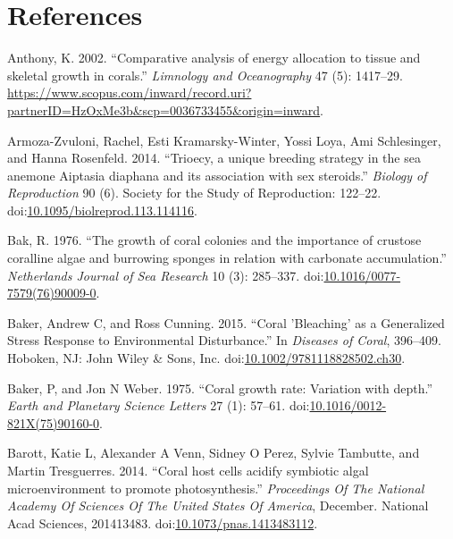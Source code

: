 \documentclass[]{elsarticle} %
\begin{document}
\section*{References}\label{references}

\hypertarget{refs}{}
\hypertarget{ref-Anthony:2002tc}{}
Anthony, K. 2002. ``Comparative analysis of energy allocation to tissue
and skeletal growth in corals.'' \emph{Limnology and Oceanography} 47
(5): 1417--29.
\url{https://www.scopus.com/inward/record.uri?partnerID=HzOxMe3b\&scp=0036733455\&origin=inward}.

\hypertarget{ref-ArmozaZvuloni:2014ju}{}
Armoza-Zvuloni, Rachel, Esti Kramarsky-Winter, Yossi Loya, Ami
Schlesinger, and Hanna Rosenfeld. 2014. ``Trioecy, a unique breeding
strategy in the sea anemone Aiptasia diaphana and its association with
sex steroids.'' \emph{Biology of Reproduction} 90 (6). Society for the
Study of Reproduction: 122--22.
doi:\href{https://doi.org/10.1095/biolreprod.113.114116}{10.1095/biolreprod.113.114116}.

\hypertarget{ref-Bak:1976bv}{}
Bak, R. 1976. ``The growth of coral colonies and the importance of
crustose coralline algae and burrowing sponges in relation with
carbonate accumulation.'' \emph{Netherlands Journal of Sea Research} 10
(3): 285--337.
doi:\href{https://doi.org/10.1016/0077-7579(76)90009-0}{10.1016/0077-7579(76)90009-0}.

\hypertarget{ref-Baker:2015kp}{}
Baker, Andrew C, and Ross Cunning. 2015. ``Coral 'Bleaching' as a
Generalized Stress Response to Environmental Disturbance.'' In
\emph{Diseases of Coral}, 396--409. Hoboken, NJ: John Wiley \& Sons,
Inc.
doi:\href{https://doi.org/10.1002/9781118828502.ch30}{10.1002/9781118828502.ch30}.

\hypertarget{ref-Baker:1975ip}{}
Baker, P, and Jon N Weber. 1975. ``Coral growth rate: Variation with
depth.'' \emph{Earth and Planetary Science Letters} 27 (1): 57--61.
doi:\href{https://doi.org/10.1016/0012-821X(75)90160-0}{10.1016/0012-821X(75)90160-0}.

\hypertarget{ref-Barott:2014gx}{}
Barott, Katie L, Alexander A Venn, Sidney O Perez, Sylvie Tambutte, and
Martin Tresguerres. 2014. ``Coral host cells acidify symbiotic algal
microenvironment to promote photosynthesis.'' \emph{Proceedings Of The
National Academy Of Sciences Of The United States Of America}, December.
National Acad Sciences, 201413483.
doi:\href{https://doi.org/10.1073/pnas.1413483112}{10.1073/pnas.1413483112}.
\end{document}
